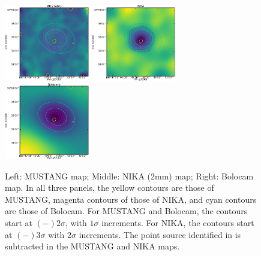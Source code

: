 \documentclass[twocolumn,traditabstract]{aa}
\begin{document}
\begin{figure}[!h]
  \centering
  \includegraphics[width=0.33\textwidth]{NIKA_ml_deproj_figs/MUSTANG_image_and_SNR_contours_v2.eps}
  \includegraphics[width=0.33\textwidth]{NIKA_ml_deproj_figs/NIKA_image_and_SNR_contours_v2.eps}
  \includegraphics[width=0.33\textwidth]{NIKA_ml_deproj_figs/BOLOCAM_image_and_SNR_contours_v2.eps}
  \caption{Left: MUSTANG map; Middle: NIKA (2mm) map; Right: Bolocam map. In all three panels, the yellow contours are those
    of MUSTANG, magenta contours of those of NIKA, and cyan contours are those of Bolocam. For MUSTANG and Bolocam, the contours
    start at $(-)2\sigma$, with $1\sigma$ increments. For NIKA, the contours start at $(-)3\sigma$ with $2\sigma$ increments.
    The point source identified in \citet{adam2015} is subtracted in the MUSTANG
    and NIKA maps.}
  \label{fig:clj1227_maps}
\end{figure}




\end{document}
